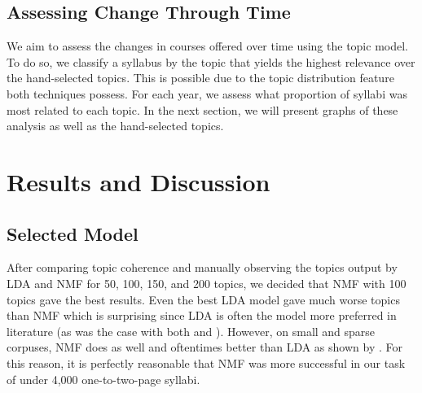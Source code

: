 \documentclass[fleqn,10pt]{JLA_article} %
\begin{document}
\subsection{Assessing Change Through Time}

We aim to assess the changes in courses offered over time using the topic model. To do so, we classify a syllabus by the topic that yields the highest relevance over the hand-selected topics. This is possible due to the topic distribution feature both techniques possess. For each year, we assess what proportion of syllabi was most related to each topic. In the next section, we will present graphs of these analysis as well as the hand-selected topics.  


\section{Results and Discussion}

\subsection{Selected Model}

After comparing topic coherence and manually observing the topics output by LDA and NMF for 50, 100, 150, and 200 topics, we decided that NMF with 100 topics gave the best results. Even the best LDA model gave much worse topics than NMF which is surprising since LDA is often the model more preferred in literature (as was the case with both \cite{hall08} and \cite{8190598}). However, on small and sparse corpuses, NMF does as well and oftentimes better than LDA as shown by \cite{chen_zhang_liu_ye_lin_2019}. For this reason, it is perfectly reasonable that NMF was more successful in our task of under 4,000 one-to-two-page syllabi.



\end{document}
